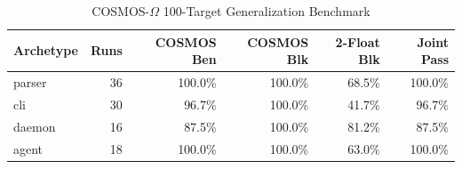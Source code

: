 \begin{table}[t]
\centering
\caption{COSMOS-$\Omega$ 100-Target Generalization Benchmark}
\begin{tabular}{lrrrrr}
\hline
Archetype & Runs & COSMOS Ben & COSMOS Blk & 2-Float Blk & Joint Pass \\
\hline
parser & 36 & 100.0\% & 100.0\% & 68.5\% & 100.0\% \\
cli & 30 & 96.7\% & 100.0\% & 41.7\% & 96.7\% \\
daemon & 16 & 87.5\% & 100.0\% & 81.2\% & 87.5\% \\
agent & 18 & 100.0\% & 100.0\% & 63.0\% & 100.0\% \\
\hline
\end{tabular}
\end{table}
